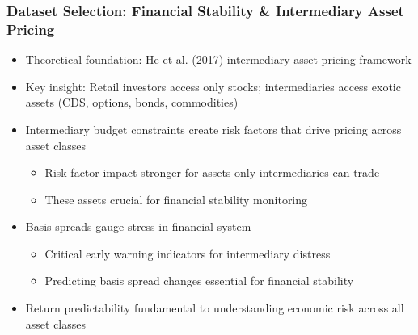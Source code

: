 \documentclass[ignorenonframetext, 9pt]{beamer}
\begin{document}
\begin{frame}
  \frametitle{Dataset Selection: Financial Stability \& Intermediary Asset Pricing}
  \begin{itemize}
  \item \alert{Theoretical foundation:} He et al. (2017) intermediary asset pricing framework
  \vspace{0.2cm}
  \item \alert{Key insight:} Retail investors access only stocks; intermediaries access exotic assets (CDS, options, bonds, commodities)
  \vspace{0.2cm}
  \item \alert{Intermediary budget constraints} create risk factors that drive pricing across asset classes
  \begin{itemize}
    \item Risk factor impact stronger for assets only intermediaries can trade
    \item These assets crucial for financial stability monitoring
  \end{itemize}
  \vspace{0.2cm}
  \item \alert{Basis spreads} gauge stress in financial system
  \begin{itemize}
    \item Critical early warning indicators for intermediary distress
    \item Predicting basis spread changes essential for financial stability
  \end{itemize}
  \vspace{0.2cm}
  \item \alert{Return predictability} fundamental to understanding economic risk across all asset classes
  \end{itemize}
\end{frame}
\end{document}
